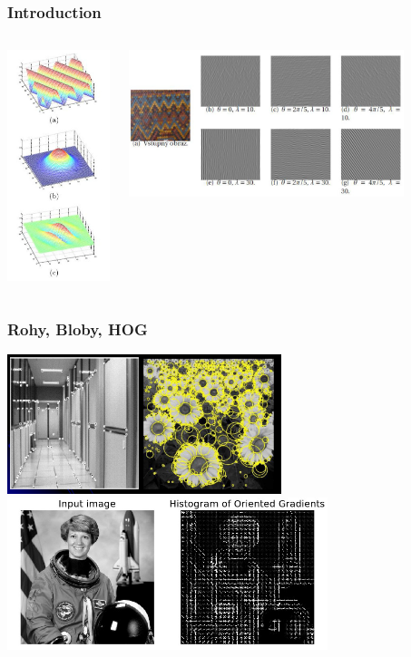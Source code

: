 \documentclass{beamer}
\begin{document}
\begin{frame}
\frametitle{Introduction}

  \begin{columns}[onlytextwidth,T]
      \column{30mm}
      \centering
      \includegraphics[width=30mm]{gabor1.png}


      \column{80mm}
      \centering
      \includegraphics[width=80mm]{gabor2.png}
  \end{columns}
\end{frame}

\begin{frame}
\frametitle{Rohy, Bloby, HOG}
\centering
\includegraphics[width=0.6\textwidth]{local1.png}\\
\includegraphics[width=0.7\textwidth]{local2.png}
\end{frame}
\end{document}
